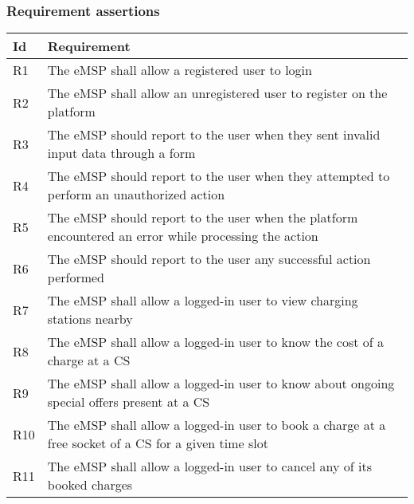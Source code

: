 \documentclass[11pt]{article}
\begin{document}
\subsubsection{Requirement assertions}

\begin{table}[H]
    \centering
    \setlength{\tabcolsep}{18pt}
    \renewcommand{\arraystretch}{1.2}
    \begin{tabularx}{\textwidth}{|>{\centering\hsize=0.1\hsize}X|>{\hsize=1.9\hsize}X|}
        \hline
        \textbf{Id} & \textbf{Requirement} \\
        \hline
        R1 & The eMSP shall allow a registered user to login \\
        \hline
        R2 & The eMSP shall allow an unregistered user to register on the platform \\
        \hline
        R3 & The eMSP should report to the user when they sent invalid input data through a form \\
        \hline
        R4 & The eMSP should report to the user when they attempted to perform an unauthorized action \\
        \hline
        R5 & The eMSP should report to the user when the platform encountered an error while processing the action \\
        \hline
        R6 & The eMSP should report to the user any successful action performed \\
        \hline
        R7 & The eMSP shall allow a logged-in user to view charging stations nearby \\
        \hline
        R8 & The eMSP shall allow a logged-in user to know the cost of a charge at a CS \\
        \hline
        R9 & The eMSP shall allow a logged-in user to know about ongoing special offers present at a CS \\
        \hline
        R10 & The eMSP shall allow a logged-in user to book a charge at a free socket of a CS for a given time slot \\
        \hline
        R11 & The eMSP shall allow a logged-in user to cancel any of its booked charges \\
        \hline 
    \end{tabularx}
    \label{tab:requirements}
\end{table}
\end{document}
